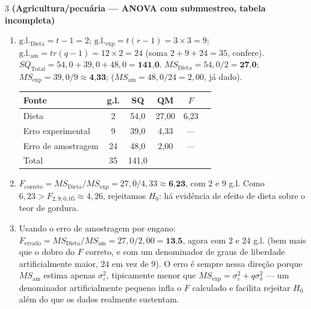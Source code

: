\documentclass[11pt]{article}
\begin{document}
\begin{questao}{3} \textbf{(Agricultura/pecuária --- ANOVA com submuestreo, tabela incompleta)}
\end{questao}
\begin{solucao}
\begin{enumerate}[label=(\alph*)]
  \item $\mathrm{g.l._{Dieta}} = t-1 = 2$; $\mathrm{g.l._{exp}} = t(r-1) = 3\times3=9$;
    $\mathrm{g.l._{am}} = tr(q-1) = 12\times2=24$ (soma $2+9+24=35$, confere).
    $SQ_{\text{Total}} = 54{,}0+39{,}0+48{,}0 = \textbf{141{,}0}$.
    $MS_{\text{Dieta}} = 54{,}0/2 = \textbf{27{,}0}$; $MS_{\text{exp}} = 39{,}0/9 \approx
    \textbf{4{,}33}$; ($MS_{\text{am}}=48{,}0/24=2{,}00$, já dado).

  \begin{center}
  \begin{tabular}{lccccc}
  \toprule
  Fonte & g.l. & SQ & QM & $F$ \\
  \midrule
  Dieta & 2 & 54{,}0 & 27{,}00 & 6{,}23 \\
  Erro experimental & 9 & 39{,}0 & 4{,}33 & --- \\
  Erro de amostragem & 24 & 48{,}0 & 2{,}00 & --- \\
  Total & 35 & 141{,}0 & & \\
  \bottomrule
  \end{tabular}
  \end{center}

  \item $F_{\text{correto}} = MS_{\text{Dieta}}/MS_{\text{exp}} = 27{,}0/4{,}33 \approx
    \textbf{6{,}23}$, com $2$ e $9$ g.l. Como $6{,}23 > F_{2,9;0{,}05}\approx 4{,}26$, rejeitamos
    $H_0$: há evidência de efeito de dieta sobre o teor de gordura.
  \item Usando o erro de amostragem por engano: $F_{\text{errado}} = MS_{\text{Dieta}}/MS_{\text{am}}
    = 27{,}0/2{,}00 = \textbf{13{,}5}$, agora com $2$ e $24$ g.l. (bem mais que o dobro do $F$
    correto, e com um denominador de graus de liberdade artificialmente maior, $24$ em vez de
    $9$). O erro é sempre nessa direção porque $MS_{\text{am}}$ estima apenas
    $\sigma_\varepsilon^2$, tipicamente menor que $MS_{\text{exp}}=\sigma_\varepsilon^2+q\sigma_\delta^2$
    --- um denominador artificialmente pequeno infla o $F$ calculado e facilita rejeitar $H_0$
    além do que os dados realmente sustentam.
\end{enumerate}
\end{solucao}
\end{document}

